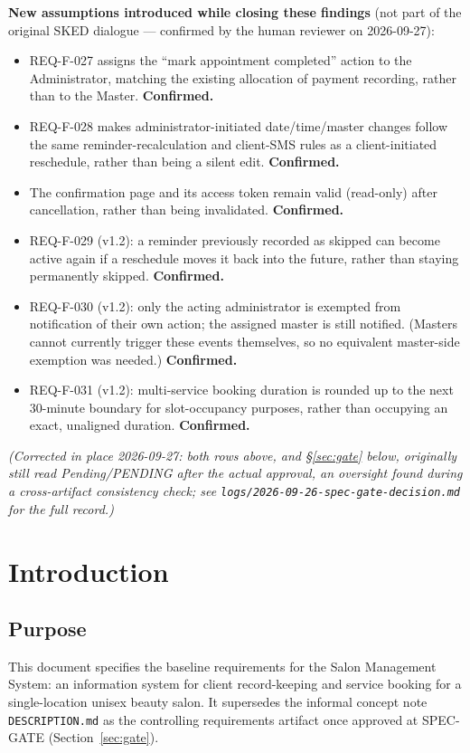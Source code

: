 \documentclass[11pt,a4paper]{article}
\begin{document}
\medskip
\noindent\textbf{New assumptions introduced while closing these findings}
(not part of the original SKED dialogue --- confirmed by the human
reviewer on 2026-09-27):
\begin{itemize}[leftmargin=1.2cm]
  \item REQ-F-027 assigns the ``mark appointment completed'' action to the
    Administrator, matching the existing allocation of payment recording,
    rather than to the Master. \textbf{Confirmed.}
  \item REQ-F-028 makes administrator-initiated date/time/master changes
    follow the same reminder-recalculation and client-SMS rules as a
    client-initiated reschedule, rather than being a silent edit.
    \textbf{Confirmed.}
  \item The confirmation page and its access token remain valid
    (read-only) after cancellation, rather than being invalidated.
    \textbf{Confirmed.}
  \item REQ-F-029 (v1.2): a reminder previously recorded as skipped can
    become active again if a reschedule moves it back into the future,
    rather than staying permanently skipped. \textbf{Confirmed.}
  \item REQ-F-030 (v1.2): only the acting administrator is exempted from
    notification of their own action; the assigned master is still
    notified. (Masters cannot currently trigger these events themselves,
    so no equivalent master-side exemption was needed.) \textbf{Confirmed.}
  \item REQ-F-031 (v1.2): multi-service booking duration is rounded up to
    the next 30-minute boundary for slot-occupancy purposes, rather than
    occupying an exact, unaligned duration. \textbf{Confirmed.}
\end{itemize}
\emph{(Corrected in place 2026-09-27: both rows above, and \S\ref{sec:gate}
below, originally still read Pending/PENDING after the actual approval, an
oversight found during a cross-artifact consistency check; see
\texttt{logs/2026-09-26-spec-gate-decision.md} for the full record.)}

\tableofcontents
\newpage

\section{Introduction}

\subsection{Purpose}
This document specifies the baseline requirements for the Salon Management
System: an information system for client record-keeping and service booking
for a single-location unisex beauty salon. It supersedes the informal
concept note \texttt{DESCRIPTION.md} as the controlling requirements
artifact once approved at SPEC-GATE (Section~\ref{sec:gate}).
\end{document}
